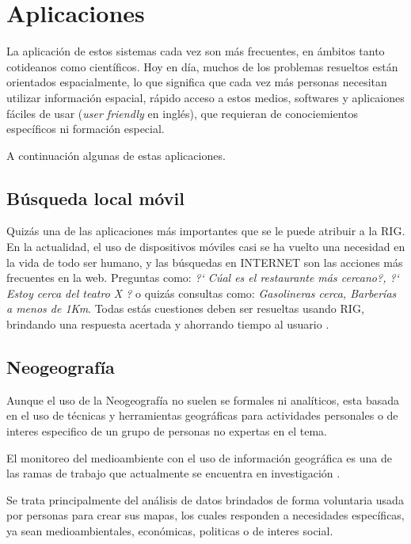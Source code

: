 \section{Aplicaciones}\label{sec:appl}

La aplicación de estos sistemas cada vez son más frecuentes, en ámbitos tanto
cotideanos como científicos. Hoy en día, muchos de los problemas resueltos
están orientados espacialmente, lo que significa que cada vez más personas
necesitan utilizar información espacial, rápido acceso a estos medios,
softwares y aplicaiones fáciles de usar (\emph{user friendly} en inglés), que
requieran de conociemientos específicos ni formación especial.

A continuación algunas de estas aplicaciones.

\subsection{Búsqueda local móvil}\label{sec:mobile}

Quizás una de las aplicaciones más importantes que se le puede atribuir a la
RIG. En la actualidad, el uso de dispositivos móviles casi se ha vuelto una
necesidad en la vida de todo ser humano, y las búsquedas en INTERNET son las
acciones más frecuentes en la web. Preguntas como: \emph{?` Cúal es el
restaurante más cercano?, ?` Estoy cerca del teatro X ?} o quizás consultas
como: \emph{Gasolineras cerca, Barberías a menos de 1Km}. Todas estás
cuestiones deben ser resueltas usando RIG, brindando una respuesta acertada y
ahorrando tiempo al usuario \cite{teevan2011, lymberopoulos2011}. 

\subsection{Neogeografía}\label{sec:neogeo}

Aunque el uso de la Neogeografía no suelen se formales ni analíticos, esta
basada en el uso de técnicas y herramientas geográficas para actividades
personales o de interes especifico de un grupo de personas no expertas en el
tema.\cite{turner2006}

El monitoreo del medioambiente con el uso de información geográfica es una de
las ramas de trabajo que actualmente se encuentra en investigación
\cite{connors2012}. 

Se trata principalmente del análisis de datos brindados de forma voluntaria
usada por personas para crear sus mapas, los cuales responden a necesidades
específicas, ya sean medioambientales, económicas, politicas o de interes
social. \cite{harris2012}


